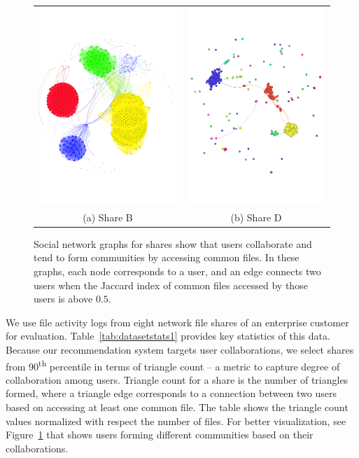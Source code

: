 \begin{figure}[!htbp]
\centering
\begin{tabular}{cc}
\centering
\includegraphics[trim = 0 4cm 2mm 5cm, clip, width=0.45\linewidth]{FileAccess/figs/6261_jacc_pt5}
& 
\includegraphics[trim = 2mm 4cm 7mm 5cm, clip, width=0.46\linewidth]{FileAccess/figs/6216_jacc_pt5} \\ 
(a) Share B & (b) Share D \\ 
\end{tabular}
\caption{Social network graphs for shares show that users collaborate
  and tend to form communities by accessing common files.  In these
  graphs, each node corresponds to a user, and an edge connects two users
  when the Jaccard index of common files accessed by those users is
  above $0.5$.}
\label{fig:snagraphs}
\end{figure}
We use file activity logs from eight network file shares of an
enterprise customer for evaluation.  Table~\ref{tab:datasetstats1}
provides key statistics of this data.  Because our recommendation
system targets user collaborations, we select shares from
90\textsuperscript{th} percentile in terms of triangle count -- a
metric to capture degree of collaboration among users.  Triangle count
for a share is the number of triangles formed, where a triangle edge
corresponds to a connection between two users based on accessing at
least one common file.  The table shows the triangle count values
normalized with respect the number of files.  For better
visualization, see Figure~\ref{fig:snagraphs} that shows users forming
different communities based on their collaborations. \\

